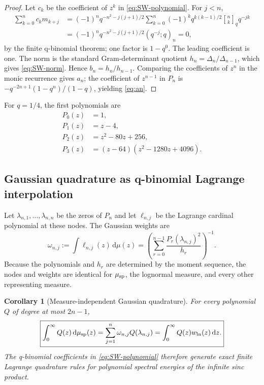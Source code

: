 \documentclass[11pt,oneside]{article}
\numberwithin{equation}{section}
\theoremstyle{plain}
\newtheorem{corollary}[theorem]{Corollary}
\theoremstyle{definition}
\theoremstyle{remark}
\newcommand{\dd}{\,\mathrm d}
\newcommand{\qbinom}[3]{\genfrac{[}{]}{0pt}{}{#1}{#2}_{#3}}
\begin{document}
\begin{proof}
Let $c_k$ be the coefficient of $z^k$ in \eqref{eq:SW-polynomial}.  For $j<n$,
\begin{align*}
 \sum_{k=0}^{n}c_km_{k+j}
 &=(-1)^nq^{-n^2-j(j+1)/2}
 \sum_{k=0}^{n}(-1)^kq^{k(k-1)/2}
 \qbinom{n}{k}{q}q^{-jk}\\
 &=(-1)^nq^{-n^2-j(j+1)/2}(q^{-j};q)_n=0,
\end{align*}
by the finite q-binomial theorem; one factor is $1-q^0$.  The leading coefficient is one.
The norm is the standard Gram-determinant quotient
$h_n=\Delta_n/\Delta_{n-1}$, which gives \eqref{eq:SW-norm}.  Hence
$b_n=h_n/h_{n-1}$.  Comparing the coefficients of $z^n$ in the monic recurrence gives
$a_n$; the coefficient of $z^{n-1}$ in $P_n$ is
$-q^{-2n+1}(1-q^n)/(1-q)$, yielding \eqref{eq:an}.
\end{proof}

For $q=1/4$, the first polynomials are
\begin{align}
 P_0(z)&=1,\nonumber\\
 P_1(z)&=z-4,\nonumber\\
 P_2(z)&=z^2-80z+256,\nonumber\\
 P_3(z)&=(z-64)(z^2-1280z+4096).
 \label{eq:first-SW-polynomials}
\end{align}

\subsection{Gaussian quadrature as q-binomial Lagrange interpolation}

Let $\lambda_{n,1},\ldots,\lambda_{n,n}$ be the zeros of $P_n$ and let
$\ell_{n,j}$ be the Lagrange cardinal polynomial at these nodes.  The Gaussian weights are
\begin{equation}
 \omega_{n,j}:=\int\ell_{n,j}(z)\dd\mu(z)
 =\left(\sum_{r=0}^{n-1}\frac{P_r(\lambda_{n,j})^2}{h_r}\right)^{-1}.
 \label{eq:Christoffel-weights}
\end{equation}
Because the polynomials and $h_r$ are determined by the moment sequence, the nodes and
weights are identical for $\mu_{\rm sp}$, the lognormal measure, and every other representing
measure.

\begin{corollary}[Measure-independent Gaussian quadrature]
\label{cor:Gaussian-quadrature}
For every polynomial $Q$ of degree at most $2n-1$,
\begin{equation}
 \boxed{
 \int_0^\infty Q(z)\dd\mu_{\rm sp}(z)
 =\sum_{j=1}^{n}\omega_{n,j}Q(\lambda_{n,j})
 =\int_0^\infty Q(z)w_{\rm ln}(z)\dd z.}
 \label{eq:Gaussian-quadrature}
\end{equation}
The q-binomial coefficients in \eqref{eq:SW-polynomial} therefore generate exact finite
Lagrange quadrature rules for polynomial spectral energies of the infinite sinc product.
\end{corollary}
\end{document}
